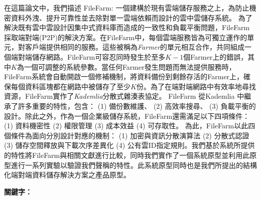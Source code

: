 \begin{abstractzh}
  在這篇論文中，我們描述 FileFarm: 一個建構於現有雲端儲存服務之上，為防止機密資料外洩、提升可靠性並去除對單一雲端依賴而設計的雲中雲儲存系統。 為了解決既有雲中雲設計因集中式資料庫而造成的一致性和負載平衡問題，FileFarm 採取端對端(P2P)的解決方案。在FileFarm中，每個雲端服務皆為可獨立運作的單元，對客戶端提供相同的服務。這些被稱為\textit{Farmer}的單元相互合作，共同組成一個端對端儲存網路。FileFarm可容忍同時發生於至多$K-1$個Farmer上的錯誤，其中$K$為一個可調整的系統參數。當任何Farmer發生問題而無法提供服務時，FileFarm系統會自動開啟一個修補機制，將資料備份到剩餘存活的Farmer上，確保每個資料區塊都在網路中被儲存了至少$K$份。為了在端對端網路中有效率地尋找資源，FileFarm實作了\textit{Kademlia}分散式雜湊表協定\cite{maymounkov2002kademlia}。 FileFarm 從Kademlia 中繼承了許多重要的特性，包含： (1) 備份數維護、 (2) 高效率搜尋、 (3) 負載平衡的設計。除此之外，作為一個企業級儲存系統，FileFarm還需滿足以下四項條件：(1) 資料機密性 (2) 權限管理 (3) 成本效益 (4) 可存取性。 為此，FileFarm以此四個條件為面向分別設計對應的機制： (1) 加密與資訊分散演算法 (2) 分散式認證 (3) 儲存空間釋放與下載次序差異化 (4) 公有雲ID指定規則。我們基於系統所提供的特性將FileFarm與相關文獻進行比較，同時我們實作了一個系統原型並利用此原型進行一系列實驗以驗證我們聲稱的特性。此系統原型同時也是我們所提出的結構化端對端資料儲存解決方案之產品原型。

\bigbreak
\noindent \textbf{關鍵字：}{\, \makeatletter \@keywordszh \makeatother}
\end{abstractzh}

